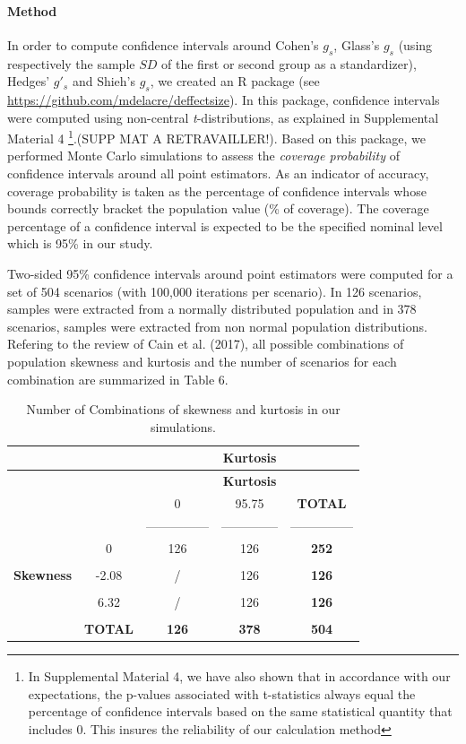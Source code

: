 \documentclass[
  man,floatsintext]{apa6}
\begin{document}
\hypertarget{method-1}{%
\paragraph{Method}\label{method-1}}

In order to compute confidence intervals around Cohen's \(g_s\), Glass's \(g_s\) (using respectively the sample \(SD\) of the first or second group as a standardizer), Hedges' \(g'_s\) and Shieh's \(g_s\), we created an R package (see \url{https://github.com/mdelacre/deffectsize}). In this package, confidence intervals were computed using non-central \emph{t}-distributions, as explained in Supplemental Material 4 \footnote{In Supplemental Material 4, we have also shown that in accordance with our expectations, the p-values associated with t-statistics always equal the percentage of confidence intervals based on the same statistical quantity that includes 0. This insures the reliability of our calculation method}.(SUPP MAT A RETRAVAILLER!). Based on this package, we performed Monte Carlo simulations to assess the \emph{coverage probability} of confidence intervals around all point estimators. As an indicator of accuracy, coverage probability is taken as the percentage of confidence intervals whose bounds correctly bracket the population value (\% of coverage). The coverage percentage of a confidence interval is expected to be the specified nominal level which is 95\% in our study.

Two-sided 95\% confidence intervals around point estimators were computed for a set of 504 scenarios (with 100,000 iterations per scenario). In 126 scenarios, samples were extracted from a normally distributed population and in 378 scenarios, samples were extracted from non normal population distributions. Refering to the review of Cain et al. (2017), all possible combinations of population skewness and kurtosis and the number of scenarios for each combination are summarized in Table 6.

\newpage

\begin{longtable}[]{@{}ccccc@{}}
\caption{Number of Combinations of skewness and kurtosis in our simulations.}\tabularnewline
\toprule
& & & \textbf{Kurtosis} &\tabularnewline
\midrule
\endfirsthead
\toprule
& & & \textbf{Kurtosis} &\tabularnewline
\midrule
\endhead
& & 0 & 95.75 & \textbf{TOTAL}\tabularnewline
& & --------------- & -------------- & ---------------\tabularnewline
& 0 & 126 & 126 & \textbf{252}\tabularnewline
& & & &\tabularnewline
\textbf{Skewness} & -2.08 & / & 126 & \textbf{126}\tabularnewline
& & & &\tabularnewline
& 6.32 & / & 126 & \textbf{126}\tabularnewline
& & & &\tabularnewline
& \textbf{TOTAL} & \textbf{126} & \textbf{378} & \textbf{504}\tabularnewline
\bottomrule
\end{longtable}
\end{document}
